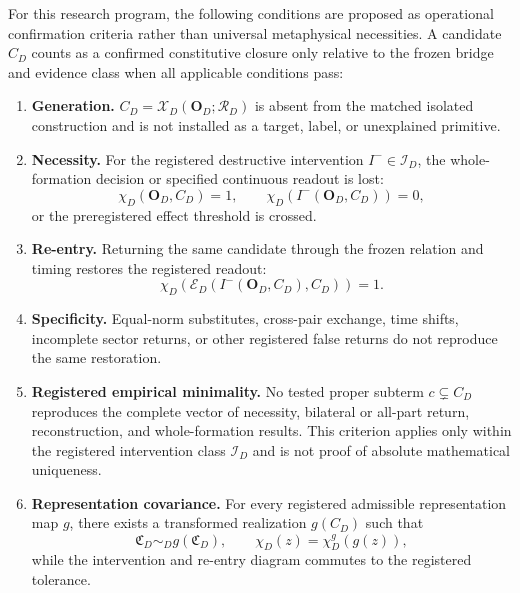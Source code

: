 \documentclass[11pt,a4paper]{article}
\begin{document}
For this research program, the following conditions are proposed as operational confirmation criteria rather than universal metaphysical necessities. A candidate $C_D$ counts as a confirmed constitutive closure only relative to the frozen bridge and evidence class when all applicable conditions pass:
\begin{enumerate}
  \item \textbf{Generation.} $C_D=\mathcal X_D(\mathbf O_D;\mathcal R_D)$ is absent from the matched isolated construction and is not installed as a target, label, or unexplained primitive.
  \item \textbf{Necessity.} For the registered destructive intervention $I^-\in\mathcal I_D$, the whole-formation decision or specified continuous readout is lost:
  \begin{equation}
    \chi_D(\mathbf O_D,C_D)=1,
    \qquad
    \chi_D\!\left(I^-(\mathbf O_D,C_D)\right)=0,
    \label{eq:necessity}
  \end{equation}
  or the preregistered effect threshold is crossed.
  \item \textbf{Re-entry.} Returning the same candidate through the frozen relation and timing restores the registered readout:
  \begin{equation}
    \chi_D\!\left(\mathcal E_D(I^-(\mathbf O_D,C_D),C_D)\right)=1.
    \label{eq:reentry-condition}
  \end{equation}
  \item \textbf{Specificity.} Equal-norm substitutes, cross-pair exchange, time shifts, incomplete sector returns, or other registered false returns do not reproduce the same restoration.
  \item \textbf{Registered empirical minimality.} No tested proper subterm $c\subsetneq C_D$ reproduces the complete vector of necessity, bilateral or all-part return, reconstruction, and whole-formation results. This criterion applies only within the registered intervention class $\mathcal I_D$ and is not proof of absolute mathematical uniqueness.
  \item \textbf{Representation covariance.} For every registered admissible representation map $g$, there exists a transformed realization $g(C_D)$ such that
  \begin{equation}
     \mathfrak C_D\sim_D g(\mathfrak C_D),
     \qquad
     \chi_D(z)=\chi_D^{g}(g(z)),
     \label{eq:covariance-condition}
  \end{equation}
  while the intervention and re-entry diagram commutes to the registered tolerance.
\end{enumerate}
\end{document}

